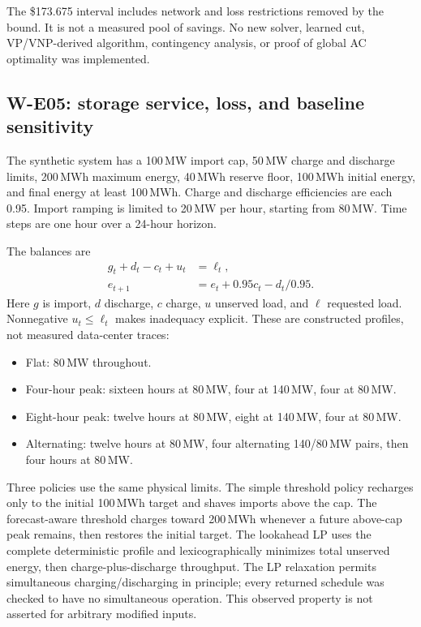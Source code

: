 \documentclass[11pt,letterpaper]{article}
\begin{document}
The \$173.675 interval includes network and loss restrictions removed by the bound. It is not a measured pool of savings. No new solver, learned cut, VP/VNP-derived algorithm, contingency analysis, or proof of global AC optimality was implemented.

\subsection{W-E05: storage service, loss, and baseline sensitivity}
The synthetic system has a 100\,MW import cap, 50\,MW charge and discharge limits, 200\,MWh maximum energy, 40\,MWh reserve floor, 100\,MWh initial energy, and final energy at least 100\,MWh. Charge and discharge efficiencies are each 0.95. Import ramping is limited to 20\,MW per hour, starting from 80\,MW. Time steps are one hour over a 24-hour horizon.

The balances are
\begin{align}
 g_t+d_t-c_t+u_t&=\ell_t,\\
 e_{t+1}&=e_t+0.95c_t-d_t/0.95.
\end{align}
Here $g$ is import, $d$ discharge, $c$ charge, $u$ unserved load, and $\ell$ requested load. Nonnegative $u_t\le\ell_t$ makes inadequacy explicit. These are constructed profiles, not measured data-center traces:
\begin{itemize}
\item Flat: 80\,MW throughout.
\item Four-hour peak: sixteen hours at 80\,MW, four at 140\,MW, four at 80\,MW.
\item Eight-hour peak: twelve hours at 80\,MW, eight at 140\,MW, four at 80\,MW.
\item Alternating: twelve hours at 80\,MW, four alternating 140/80\,MW pairs, then four hours at 80\,MW.
\end{itemize}

Three policies use the same physical limits. The simple threshold policy recharges only to the initial 100\,MWh target and shaves imports above the cap. The forecast-aware threshold charges toward 200\,MWh whenever a future above-cap peak remains, then restores the initial target. The lookahead LP uses the complete deterministic profile and lexicographically minimizes total unserved energy, then charge-plus-discharge throughput. The LP relaxation permits simultaneous charging/discharging in principle; every returned schedule was checked to have no simultaneous operation. This observed property is not asserted for arbitrary modified inputs.
\end{document}
